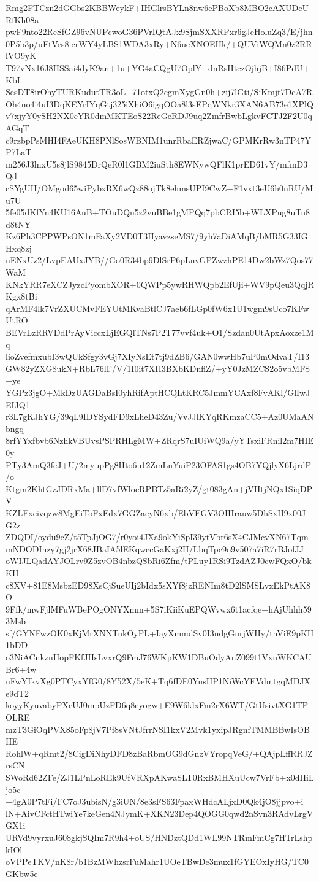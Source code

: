 Rmg2FTCzn2dGGbs2KBBWeykF+IHGlrsBYLn8nw6ePBoXb8MBO2cAXUDcURfKh08a
pwF9nto22RcSfGZ96vNUPcwoG36PVrIQtAJx9SjmSXXRPxr6gJeHoluZq3/E/jhn
0P5b3p/uFtVes8icrWY4yLBS1WDA3xRy+N6ueXNOEHk/+QUViWQMn0z2RRlVO9yK
T97vNx16J8HSSai4dyK9an+1u+YG4aCQgU7OplY+dnRsHtczOjhjB+I86PdU+KbI
SesDT8irOhyTURKudutTR3oL+71otxQ2cgmXygGn0h+zij7lGti/SiKmjt7DcA7R
Oh4no4i4uI3DqKEYrIYqGtj325iXhiO6igqOOa8l3sEPqWNkr3XAN6AB73e1XPlQ
v7xjyY0ySH2NX0cYR0dmMKTEoS22ReGeRDJ9uq2ZmfrBwbLgkvFCTJ2F2U0qAGqT
c9rzbpPsMHI4FAeUKH8PNlSosWBNIM1unrRbaERZjwaC/GPMKrRw3nTP47YP7LaT
m256J3lnxU5s8jlS9845DrQeR0l1GBM2iuSth8EWNywQFlK1prED61vY/mfmD3Qd
cSYgUH/OMgod65wiPybxRX6wQz88ojTk8ehmsUPI9CwZ+F1vxt3eU6h0nRU/Mu7U
5fe05dKfYn4KU16AuB+TOuDQu5z2vuBBe1gMPQq7pbCRI5b+WLXPug8uTu8d8tNY
Kz6Ph3CPPWPsON1mFaXy2VD0T3HyavzseMS7/9yh7aDiAMqB/bMR5G33IGHxq8zj
nENxUz2/LvpEAUxJYB//Go0R34bp9DlSrP6pLnvGPZwzhPE14Dw2bWz7Qos77WaM
KNkYRR7eXCZJyzcPyombXOR+0QWPp5ywRHWQpb2EfUji+WV9pQeu3QqjRKgx8tBi
qArMF4lk7VrZXUCMvFEYUtMKvaBtlCJ7aeb6fLGp0fW6x1U1wgm9sUco7KFwUtRO
BEVrLzRRVDdPrAyViccxLjEGQlTNs7P2T77vvf4uk+O1/Szdan0UtApxAoxze1Mq
lioZvefmxubI3wQUkSfgy3vGj7XIyNsEt7tj9dZB6/GAN0wwHb7uP0mOdvaT/I13
GW82yZXG8ukN+RbL76lF/V/1I0it7XII3BXbKDnflZ/+yY0JzMZCS2o5vbMFS+ye
YGPz3jgO+MkDzUAGDaBsI0yhRifAptHCQLtKRC5JmmYCAxf8FvAKl/GlIwJEIJQ1
r3L7gKJhYG/39qL9IDYSydFD9xLheD43Zu/VvJJlKYqRKmzaCC5+Az0UMaANbngq
8rfYYxfbvb6NzhkVBUvsPSPRHLgMW+ZRqrS7uIUiWQ9a/yYTsxiFRnil2m7HIE0y
PTy3AmQ3fcJ+U/2myupPg8Hto6u12ZmLnYuiP23OFAS1gs4OB7YQjlyX6LjrdP/o
Ktgm2KhtGzJDRxMa+llD7vfWlocRPBTz5aRi2yZ/gt083gAn+jVHtjNQx1SiqDPV
KZLFxcivqzw8MgEiToFxEdx7GGZacyN6xb/EbVEGV3OIHrauw5DhSxH9x00J+G2z
ZDQDI/oydu9cZ/t5TpJjOG7/r0yoi4JXa9okYiSpI39ytVbr6sX4CJMcvXN67Tqm
mNDODInzy7gj2jrX68JBaIA5lEKqwccGaKxj2H/LbqTpc9o9v507a7iR7rBJofJJ
oWIJLQadAYJOLrv9Z5zvOB4nbzQSbRi6Zfm/tPLuy1RSi9TzdAZJ0cwFQxO/bkKH
c8XV+81E8MsbzED98XsCjSueUIj2bIdx5sXYf8jzRENIm8tD2lSMSLvxEkPtAK8O
9Ffk/mwFjlMFuWBePOgONYXmm+5S7iKiiKuEPQWvwx6t1acfqe+hAjUhhh593Msb
sf/GYNFwzOK0xKjMrXNNTnkOyPL+IayXmmdSv0I3ndgGurjWHy/tnViE9pKH1bDD
o3NiACnkznHopFKfJHsLvxrQ9FmJ76WKpKW1DBuOdyAnZ099t1VxuWKCAUBr6+4w
uFwYIkvXg0PTCyxYfG0/8Y52X/5eK+Tq6fDE0YusHP1NiWcYEVdmtgqMDJXe9dT2
koyyKyuvabyPXeUJ0mpUzFD6q8eyogw+E9W6klxFm2rX6WT/GtUsivtXG1TPOLRE
mzT3GiOqPVX85oFp8jV7Pf8sVNtJfrrNSI1kxV2Mvk1yxipJRgnfTMMBBwIsOBHE
RohlW+qRmt2/8CigDiNhyDFD8zBaRbmOG9dGnzVYropqVeG/+QAjpLffRRJZrsCN
SWoRd62ZFe/ZJ1LPnLoREk9UfVRXpAKwaSLT0RxBMHXuUcw7VrFb+x0dIIiLjo5c
+4gA0P7tFi/FC7oJ3ubisN/g3iUN/8e3sFS63FpaxWHdcALjxD0Qk4jO8jjpvo+i
lN+AivCFctHTwiYe7keGen4NJymK+XKN23Dep4QOGG0qwd2nSvn3RAdvLrgVGX1i
URVd9vyrxuJ608gkjSQIm7R9h4+oUS/HNDztQDd1WL99NTRmFmCg7HTrLshpkIOl
oVPPeTKV/nK8r/b1BzMWhzsrFuMahr1UOeTBwDe3mux1fGYEOxIyHG/TC0GKbw5e
